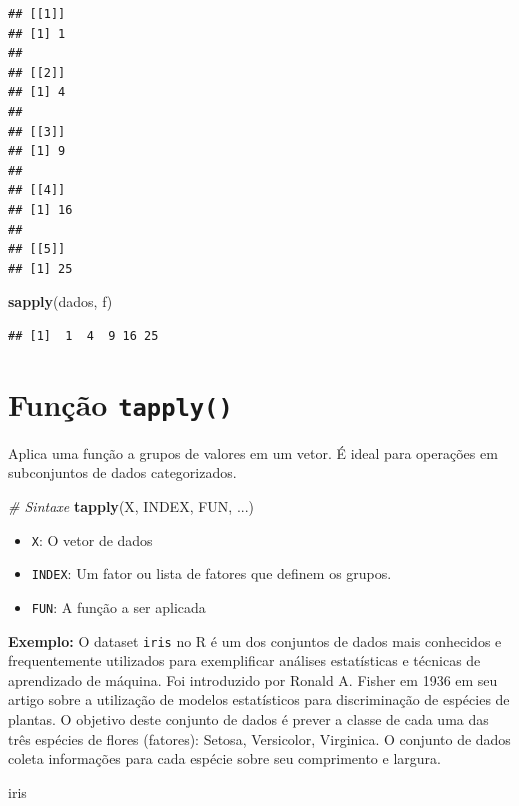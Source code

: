 \documentclass[
]{book}
\newenvironment{Shaded}{\begin{snugshade}}{\end{snugshade}}
\newcommand{\CommentTok}[1]{\textcolor[rgb]{0.56,0.35,0.01}{\textit{#1}}}
\newcommand{\FunctionTok}[1]{\textcolor[rgb]{0.13,0.29,0.53}{\textbf{#1}}}
\newcommand{\NormalTok}[1]{#1}
\theoremstyle{definition}
\theoremstyle{definition}
\theoremstyle{definition}
\theoremstyle{definition}
\theoremstyle{remark}
\begin{document}
\begin{verbatim}
## [[1]]
## [1] 1
## 
## [[2]]
## [1] 4
## 
## [[3]]
## [1] 9
## 
## [[4]]
## [1] 16
## 
## [[5]]
## [1] 25
\end{verbatim}

\begin{Shaded}
\begin{Highlighting}[]
\FunctionTok{sapply}\NormalTok{(dados, f)}
\end{Highlighting}
\end{Shaded}

\begin{verbatim}
## [1]  1  4  9 16 25
\end{verbatim}

\section{\texorpdfstring{Função \texttt{tapply()}}{Função tapply()}}\label{funuxe7uxe3o-tapply}

Aplica uma função a grupos de valores em um vetor. É ideal para operações em subconjuntos de dados categorizados.

\begin{Shaded}
\begin{Highlighting}[]
\CommentTok{\# Sintaxe}
\FunctionTok{tapply}\NormalTok{(X, INDEX, FUN, ...)}
\end{Highlighting}
\end{Shaded}

\begin{itemize}
\item
  \texttt{X}: O vetor de dados
\item
  \texttt{INDEX}: Um fator ou lista de fatores que definem os grupos.
\item
  \texttt{FUN}: A função a ser aplicada
\end{itemize}

\textbf{Exemplo:} O dataset \texttt{iris} no R é um dos conjuntos de dados mais conhecidos e frequentemente utilizados para exemplificar análises estatísticas e técnicas de aprendizado de máquina. Foi introduzido por Ronald A. Fisher em 1936 em seu artigo sobre a utilização de modelos estatísticos para discriminação de espécies de plantas. O objetivo deste conjunto de dados é prever a classe de cada uma das três espécies de flores (fatores): Setosa, Versicolor, Virginica. O conjunto de dados coleta informações para cada espécie sobre seu comprimento e largura.

\begin{Shaded}
\begin{Highlighting}[]
\NormalTok{iris}
\end{Highlighting}
\end{Shaded}
\end{document}
